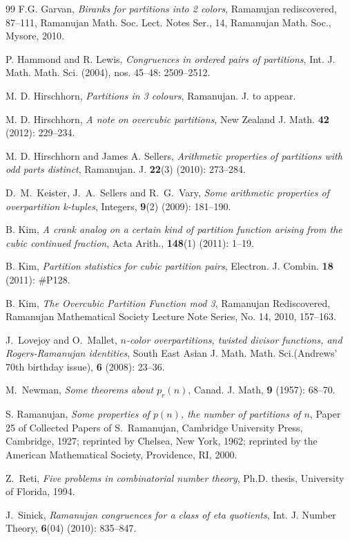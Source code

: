 \documentclass[12pt]{amsart}
\numberwithin{equation}{section}
\theoremstyle{plain}
\theoremstyle{definition}
\begin{document}
\begin{thebibliography}{99}
F.G. Garvan, \emph{Biranks for partitions into 2 colors}, Ramanujan rediscovered, 87--111, Ramanujan Math. Soc. Lect. Notes Ser., 14, Ramanujan Math. Soc., Mysore, 2010.

P. Hammond and R. Lewis, \emph{Congruences in ordered pairs of partitions}, Int. J. Math. Math. Sci. (2004), nos. 45--48: 2509--2512.

M. D. Hirschhorn, \emph{Partitions in 3 colours}, Ramanujan. J. to appear.

M. D. Hirschhorn, \emph{A note on overcubic partitions}, New Zealand J. Math. {\bf 42} (2012): 229--234.

M. D. Hirschhorn and James A. Sellers, \emph{Arithmetic properties of partitions with odd parts distinct}, Ramanujan. J. \textbf{22}(3) (2010): 273--284.

D.~M.~Keister, J.~A.~Sellers and R.~G.~Vary, \emph{Some arithmetic properties of overpartition k-tuples}, Integers, {\bf 9}(2) (2009): 181--190.

B. Kim, \emph{A crank analog on a certain kind of partition function arising from the cubic continued fraction},  Acta Arith., \textbf{148}(1) (2011): 1--19.

B. Kim, \emph{Partition statistics for cubic partition pairs}, Electron. J. Combin. \textbf{18} (2011): \#P128.

B. Kim, \emph{The Overcubic Partition Function mod 3}, Ramanujan Rediscovered, Ramanujan Mathematical Society Lecture Note Series, No. 14, 2010, 157--163.

J.~Lovejoy and O.~Mallet, \emph{$n$-color overpartitions, twisted divisor functions, and Rogers-Ramanujan identities}, South East Asian J. Math. Math. Sci.(Andrews' 70th birthday issue), {\bf 6} (2008): 23--36.

M.~Newman, \emph{Some theorems about $p_r (n)$}, Canad. J. Math, {\bf 9} (1957): 68--70.

S. Ramanujan, \emph{Some properties of $p(n)$, the number of partitions of $n$}, Paper 25 of Collected Papers of S.~Ramanujan, Cambridge University Press, Cambridge, 1927; reprinted by Chelsea, New York, 1962; reprinted by the American Mathematical Society, Providence, RI, 2000.

Z.~Reti, \emph{Five problems in combinatorial number theory}, Ph.D. thesis, University of Florida, 1994.

J.~Sinick, \emph{Ramanujan congruences for a class of eta quotients}, Int. J. Number Theory, {\bf 6}(04) (2010): 835--847.


\end{thebibliography}
\end{document}
